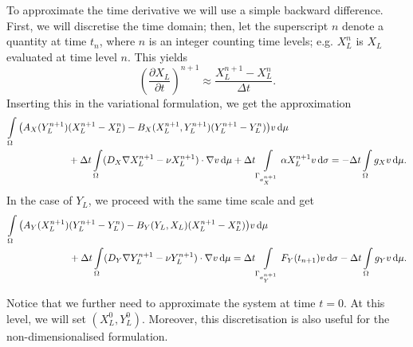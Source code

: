 \documentclass[11pt]{article}
\begin{document}
To approximate the time derivative we will use a simple backward difference. First, we will discretise the time domain; then, let the superscript $n$ denote a quantity at time $t_n$, where $n$ is an integer counting time levels; e.g. $X_L^n$ is $X_L$ evaluated at time level $n$. This yields
\begin{equation}
    \left(\frac{\partial X_L}{\partial t}\right)^{n+1} \approx \frac{X_L^{n+1} - X_L^n}{\Delta t}.
\end{equation}
Inserting this in the variational formulation, we get the approximation
\begin{equation}
\begin{aligned}
    \int\limits_\Omega
    \big(
    A_X(Y_L^{n+1}) &(X_L^{n+1} - X_L^n) - B_X(X_L^{n+1},Y_L^{n+1}) (Y_L^{n+1} - Y_L^n)  
    \big) v \dif \mu
    \\
    &+
    \Delta t \int\limits_\Omega        (D_X \nabla X_L^{n+1} - \nu X_L^{n+1}) \cdot \nabla v  \dif \mu
    +
    \Delta t \int\limits_{\Gamma_{a_X^{n+1}}}    \alpha X_L^{n+1} v    \dif \sigma
    =
    -\Delta t \int\limits_\Omega        g_X v \dif \mu.
\end{aligned}
\end{equation}
In the case of $Y_L$, we proceed with the same time scale and get
\begin{equation}
\begin{aligned}
    \int\limits_\Omega
    \big(
        A_Y(X_L^{n+1}) & (Y_L^{n+1} - Y_L^n)  - B_Y(Y_L,X_L) (X_L^{n+1} - X_L^n)
    \big) v \dif \mu
    \\
    &
    + \Delta t\int\limits_\Omega        (D_Y \nabla Y_L^{n+1} - \nu Y_L^{n+1}) \cdot \nabla v  \dif \mu
    =
    \Delta t\int\limits_{\Gamma_{a_Y^{n+1}}}     F_Y(t_{n+1}) v    \dif \sigma
    -\Delta t\int\limits_\Omega        g_Y v \dif \mu.
\end{aligned}
\end{equation}

Notice that we further need to approximate the system at time \(t=0\). At this level, we will set \( (X_L^0,Y_L^0)\). Moreover, this discretisation is also useful for the non-dimensionalised formulation.
\end{document}
